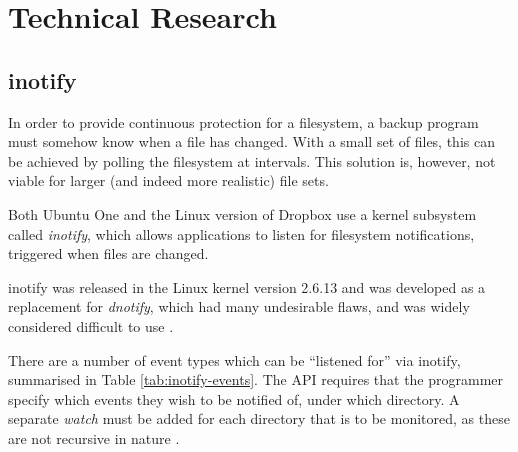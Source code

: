 \section{Technical Research}

\subsection{inotify}

In order to provide continuous protection for a filesystem, a backup program
must somehow know when a file has changed. With a small set of files, this can
be achieved by polling the filesystem at intervals. This solution is, however,
not viable for larger (and indeed more realistic) file sets.

Both Ubuntu One and the Linux version of Dropbox use a kernel subsystem called
\emph{inotify}, which allows applications to listen for filesystem
notifications, triggered when files are changed.

inotify was released in the Linux kernel version 2.6.13 and was developed as
a replacement for \emph{dnotify}, which had many undesirable flaws, and was
widely considered difficult to use \cite{love2005}.

There are a number of event types which can be ``listened for'' via inotify,
summarised in Table \ref{tab:inotify-events}. The API requires that the
programmer specify which events they wish to be notified of, under which
directory. A separate \emph{watch} must be added for each directory that is to
be monitored, as these are not recursive in nature \cite{love2005}.


